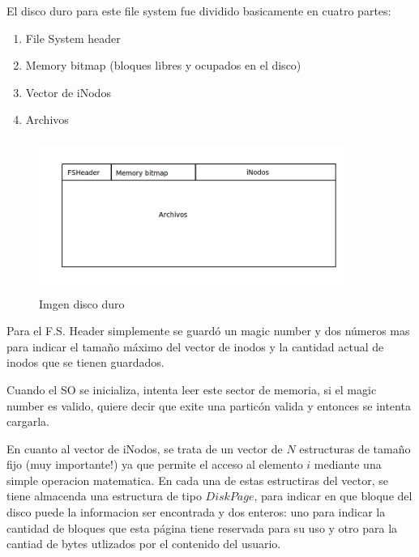 \documentclass[english]{article}
\begin{document}
El disco duro para este file system fue dividido basicamente en cuatro
partes:
\begin{enumerate}
\item File System header
\item Memory bitmap (bloques libres y ocupados en el disco)
\item Vector de iNodos
\item Archivos
\end{enumerate}
\begin{figure}[H]
\includegraphics[width=10cm,height=5cm,keepaspectratio]{Imagen_disco}

\caption{Imgen disco duro}
\end{figure}


Para el F.S. Header simplemente se guardó un magic number y dos números
mas para indicar el tamaño máximo del vector de inodos y la cantidad
actual de inodos que se tienen guardados.

Cuando el SO se inicializa, intenta leer este sector de memoria, si
el magic number es valido, quiere decir que exite una particón valida
y entonces se intenta cargarla.

En cuanto al vector de iNodos, se trata de un vector de $N$ estructuras
de tamaño fijo (muy importante!) ya que permite el acceso al elemento
$i$ mediante una simple operacion matematica. En cada una de estas
estructiras del vector, se tiene almacenda una estructura de tipo
$DiskPage$, para indicar en que bloque del disco puede la informacion
ser encontrada y dos enteros: uno para indicar la cantidad de bloques
que esta página tiene reservada para su uso y otro para la cantiad
de bytes utlizados por el contenido del usuario.
\end{document}
